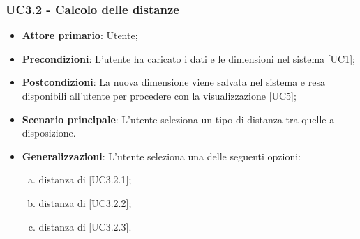 \subsubsection{UC3.2 - Calcolo delle distanze}
\begin{itemize}
	\item \textbf{Attore primario}: Utente;
	\item \textbf{Precondizioni}: L'utente ha caricato i dati e le dimensioni nel sistema [UC1];
	\item \textbf{Postcondizioni}: La nuova dimensione viene salvata nel sistema e resa disponibili all'utente per procedere con la visualizzazione [UC5];

	\item \textbf{Scenario principale}: L'utente seleziona un tipo di distanza tra quelle a disposizione.
	
	\item \textbf{Generalizzazioni}: L'utente seleziona una delle seguenti opzioni:
	
	\begin{enumerate}[(a)]
		\item distanza di  [UC3.2.1];
		\item distanza di  [UC3.2.2];
		\item distanza di  [UC3.2.3].
	\end{enumerate}
\end{itemize}